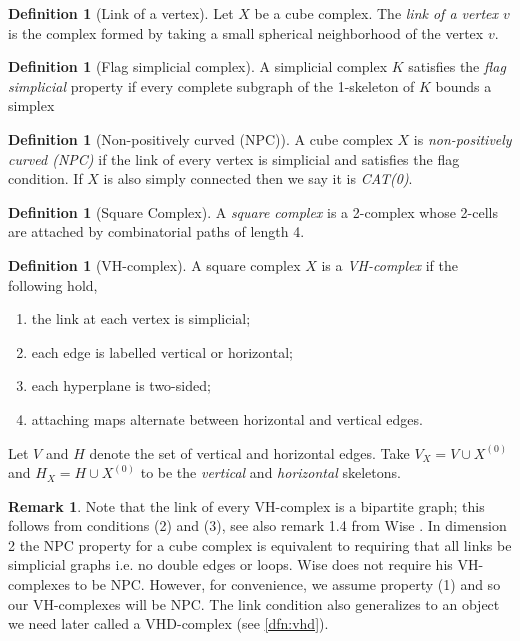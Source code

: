 \documentclass[12pt,parskip=full]{report}
\theoremstyle{plain}
\theoremstyle{definition}
\newtheorem{rmk}[thm]{Remark}
\newtheorem{dfn}[thm]{Definition}
\begin{document}
\begin{dfn}
    [Link of a vertex]
    Let \(X\) be a cube complex. The \emph{link of a vertex \(v\)} is the complex formed by taking a small spherical neighborhood of the vertex \(v\).
\end{dfn}

\begin{dfn}
    [Flag simplicial complex]
    A simplicial complex \(K\) satisfies the \emph{flag simplicial} property if every complete subgraph of the 1-skeleton of \(K\) bounds a simplex 
\end{dfn}

\begin{dfn}
    [Non-positively curved (NPC)]
    A cube complex \(X\) is \emph{non-positively curved (NPC)} if the link of every vertex is simplicial and satisfies the flag condition. If \(X\) is also simply connected then we say it is \emph{CAT(0)}.
\end{dfn}


\begin{dfn}
    [Square Complex]
    A \emph{square complex} is a 2-complex whose 2-cells are attached by combinatorial paths of length 4.
\end{dfn}

\begin{dfn}
    [VH-complex]
    A square complex $X$ is a \emph{VH-complex} if the following hold,
    \begin{enumerate}
        \item the link at each vertex is simplicial;
        \item each edge is labelled vertical or horizontal;
        \item each hyperplane is two-sided;
        \item attaching maps alternate between horizontal and vertical edges.
    \end{enumerate}
    Let $V$ and $H$ denote the set of vertical and horizontal edges. Take $V_X = V \cup X^{(0)}$ and $H_X = H \cup X^{(0)}$ to be the \emph{vertical} and \emph{horizontal} skeletons. 
\end{dfn}

\begin{rmk}
Note that the link of every VH-complex is a bipartite graph; this follows from conditions (2) and (3), see also remark 1.4 from Wise \cite{wisethesis}. In dimension 2 the NPC property for a cube complex is equivalent to requiring that all links be simplicial graphs i.e. no double edges or loops. Wise does not require his VH-complexes to be NPC. However, for convenience, we assume property (1) and so our VH-complexes will be NPC. The link condition also generalizes to an object we need later called a VHD-complex (see \ref{dfn:vhd}).
\end{rmk}
\end{document}
